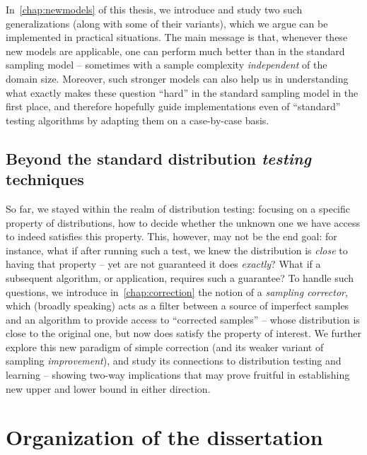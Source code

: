 In~\cref{chap:newmodels} of this thesis, we introduce and study two such generalizations (along with some of their variants), which we argue can be implemented in practical situations. The main message is that, whenever these new models are applicable, one can perform much better than in the standard sampling model -- sometimes with a sample complexity \emph{independent} of the domain size. Moreover, such stronger models can also help us in understanding what exactly makes these question ``hard'' in the standard sampling model in the first place, and therefore hopefully guide implementations even of ``standard'' testing algorithms by adapting them on a case-by-case basis.

\subsection*{Beyond the standard distribution \emph{testing} techniques} So far, we stayed within the realm of distribution testing: focusing on a specific property of distributions, how to decide whether the unknown one we have access to indeed satisfies this property. This, however, may not be the end goal: for instance, what if after running such a test, we knew the distribution is \emph{close} to having that property -- yet are not guaranteed it does \emph{exactly}? What if a subsequent algorithm, or application, requires such a guarantee? To handle such questions, we introduce in~\cref{chap:correction} the notion of a \emph{sampling corrector}, which (broadly speaking) acts as a filter between a source of imperfect samples and an algorithm to provide access to ``corrected samples'' -- whose distribution is close to the original one, but now does satisfy the property of interest. We further explore this new paradigm of simple correction (and its weaker variant of sampling \emph{improvement}), and study its connections to distribution testing and learning -- showing two-way implications that may prove fruitful in establishing new upper and lower bound in either direction. 

\section*{Organization of the dissertation}

